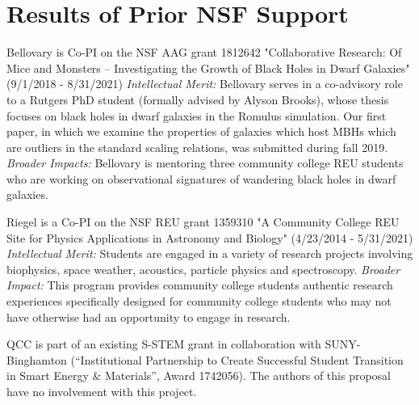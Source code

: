 \documentclass[12pt]{article}
\begin{document}



\vspace{-5mm}
\section{Results of Prior NSF Support}
\vspace{-3mm}
Bellovary is Co-PI on the NSF AAG grant 1812642 "Collaborative Research: Of Mice and Monsters -- Investigating the Growth of Black Holes in Dwarf Galaxies" (9/1/2018 - 8/31/2021)  {\em Intellectual Merit:}  Bellovary serves in a co-advisory role to a Rutgers PhD student (formally advised by Alyson Brooks), whose thesis focuses on black holes in dwarf galaxies in the Romulus simulation.  Our first paper, in which we examine the properties of galaxies which host MBHs which are outliers in the standard scaling relations, was submitted during fall 2019.  {\em Broader Impacts:}  Bellovary is mentoring three community college REU students who are working on observational signatures of wandering black holes in dwarf galaxies.

Riegel is a Co-PI on the NSF REU grant 1359310 "A Community College REU Site for Physics Applications in Astronomy and Biology" (4/23/2014 - 5/31/2021) {\em Intellectual Merit:} Students are engaged in a variety of research projects involving biophysics, space weather, acoustics, particle physics and spectroscopy. {\em Broader Impact:} This program provides community college students authentic research experiences specifically designed for community college students who may not have otherwise had an opportunity to engage in research. 

QCC is part of an existing S-STEM grant in collaboration with SUNY-Binghamton (``Institutional Partnership to Create Successful Student Transition in Smart Energy \& Materials'', Award 1742056).  The authors of this proposal have no involvement with this project.

\newpage

\end{document}
